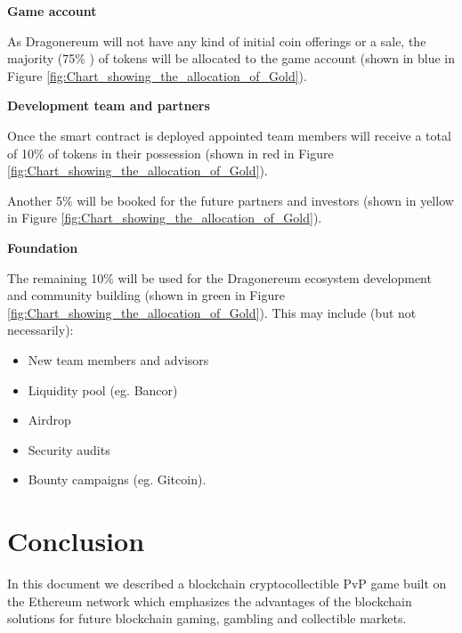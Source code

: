 \documentclass[12pt]{article}
\begin{document}


\textbf{Game account}\par

As Dragonereum will not have any kind of initial coin offerings or a sale, the majority (75$\%$ ) of tokens will be allocated to the game account (shown in blue in Figure \ref{fig:Chart_showing_the_allocation_of_Gold}).\par

\textbf{Development team and partners}\par

Once the smart contract is deployed appointed team members will receive a total of 10$\%$  of tokens in their possession (shown in red in Figure \ref{fig:Chart_showing_the_allocation_of_Gold}).\par

Another 5$\%$ will be booked for the future partners and investors (shown in yellow in Figure \ref{fig:Chart_showing_the_allocation_of_Gold}).\par

\textbf{Foundation}\par

The remaining 10$\%$  will be used for the Dragonereum ecosystem development and community building (shown in green in Figure \ref{fig:Chart_showing_the_allocation_of_Gold}). This may include (but not necessarily):\par

\begin{itemize}
	\item New team members and advisors\par

	\item Liquidity pool (eg. Bancor)\par

	\item Airdrop\par

	\item Security audits\par

	\item Bounty campaigns (eg. Gitcoin).
\end{itemize}\par


\newpage

\vspace{\baselineskip}\section{Conclusion}
In this document we described a blockchain cryptocollectible PvP game built on the Ethereum network which emphasizes the advantages of the blockchain solutions for future blockchain gaming, gambling and collectible markets.  \par
\end{document}
